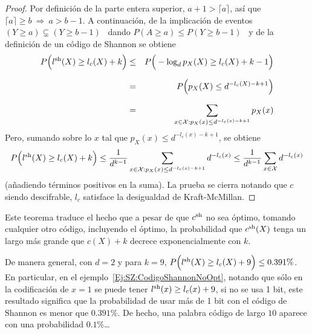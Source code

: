 \begin{proof}
  Por definici\'on de la parte entera superior, $a + 1 > \lceil a \rceil$, as\'i
  que $\lceil a \rceil \ge b \: \Rightarrow \: a > b-1$. A continuaci\'on, de la
  implicaci\'on de eventos $(Y  \ge a) \varsubsetneq (Y \ge b-1)$ \  dando $P(A \ge a)
  \le P(Y \ge b-1)$ \ y de la definici\'on de un c\'odigo de Shannon se obtiene
  \begin{eqnarray*}
  P\Big( l^{\mathrm{sh}}(X)  \ge l_c(X) + k  \Big) & \le & P\Big(  - \log_d p_X(X)
  \ge  l_c(X) + k  - 1  \Big)\\[2.5mm]
  & = &  P\Big( p_X(X)  \le d^{-l_c(X)  - k  + 1} \Big)\\[2.5mm]
  & = &  \sum_{x \in \mathcal{X} : p_X(x) \le d^{-l_c(x)  - k  + 1}} p_X(x)
  \end{eqnarray*}
  Pero, sumando sobre  lo $x$ tal que $p_X(x) \le d^{-l_c(x)  - k + 1}$,
  se obtiene
  \[
  P\Big( l^{\mathrm{sh}}(X)  \ge l_c(X) + k  \Big) \le \frac{1}{d^{k-1}} \sum_{x  \in \mathcal{X} :
    p_X(x) \le d^{-l_c(x) - k + 1}} d^{-l_c(x)}
  \le \frac{1}{d^{k-1}} \sum_{x \in \mathcal{X}} d^{-l_c(x)}
  \]
  (a\~nadiendo t\'erminos positivos en la suma). La prueba se cierra notando que
  $c$ siendo descifrable, $l_c$ satisface la desigualdad de Kraft-McMillan.
\end{proof}
%
Este  teorema traduce  el hecho  que a  pesar de  que $c^{\mathrm{sh}}$  no  sea \'optimo,
tomando  cualquier otro c\'odigo,  incluyendo el  \'optimo, la  probabilidad que
$c^{\mathrm{sh}}(X)$ tenga un largo m\'as grande que $c(X)+k$ decrece exponencialmente con
$k$.
%
\begin{ejemplo}
\label{Ej:SZ:CompetitividadCodigoShannon}
%
  De manera general, con $d = 2$ y para $k = 9$, $P\Big( l^{\mathrm{sh}}(X) \ge l_c(X) + 9
  \Big)      \le       0.391      \%$.      En       particular,      en      el
  ejemplo~\ref{Ej:SZ:CodigoShannonNoOpt},    notando    que    s\'olo   en    la
  codificaci\'on de $x=1$ se puede tener $l^{\mathrm{sh}}(x) \ge l_c(x) + 9$, si no se usa
  1 bit, este resultado significa que la probabilidad de usar m\'as de 1 bit con
  el c\'odigo de Shannon es menor que $0.391 \%$. De hecho, una palabra c\'odigo
  de largo $10$ aparece con una probabilidad $0.1\%$\ldots
\end{ejemplo}

